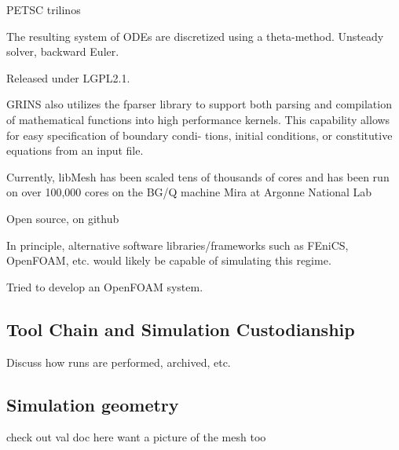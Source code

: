 PETSC\cite{petsc} trilinos\cite{trilinos}

The resulting system of ODEs are discretized using a theta-method. 
Unsteady solver, backward Euler. 

Released under LGPL2.1\cite{lgpl}. 

GRINS also utilizes the fparser\cite{fparser}
library to support both parsing and compilation of mathematical
functions into high 
performance kernels. This capability allows for easy specification of
boundary condi- 
tions, initial conditions, or constitutive equations from an input file.

Currently, libMesh has been scaled tens of thousands of cores and has
been run on over 100,000 cores on the BG/Q machine Mira at Argonne National
Lab\cite{libmesh-scaling}

Open source, on github\cite{github}

In principle, alternative software libraries/frameworks such as
FEniCS\cite{fenics}, OpenFOAM\cite{openfoam}, etc. would likely be
capable of simulating this regime. 

Tried to develop an OpenFOAM system.   

\subsection{Tool Chain and Simulation Custodianship}

Discuss how runs are performed, archived, etc. 

\subsection{Simulation geometry}

check out val doc here
want a picture of the mesh too
